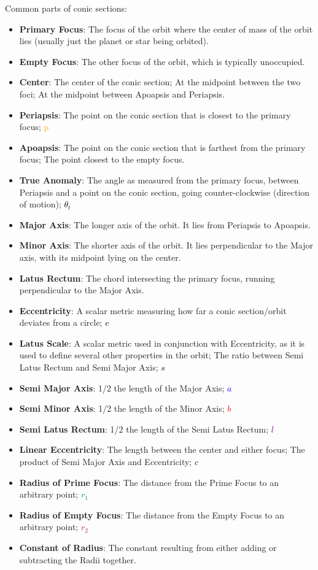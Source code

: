 Common parts of conic sections:
\begin{itemize}
    \item \textbf{Primary Focus}: The focus of the orbit where the center of mass of the orbit lies (usually just the planet or star being orbited).
    \item \textbf{Empty Focus}\aster: The other focus of the orbit, which is typically unoccupied.
    \item \textbf{Center}\aster: The center of the conic section; At the midpoint between the two foci; At the midpoint between Apoapsis and Periapsis.
    \item \textbf{Periapsis}: The point on the conic section that is closest to the primary focus; \textcolor{orange}{p}
    \item \textbf{Apoapsis}\aster: The point on the conic section that is farthest from the primary focus; The point closest to the empty focus.
    \item \textbf{True Anomaly}: The angle as measured from the primary focus, between Periapsis and a point on the conic section, going counter-clockwise (direction of motion); \textcolor{black}{$\theta_t$}
    \item \textbf{Major Axis}\aster: The longer axis of the orbit. It lies from Periapsis to Apoapsis.
    \item \textbf{Minor Axis}\aster: The shorter axis of the orbit. It lies perpendicular to the Major axis, with its midpoint lying on the center.
    \item \textbf{Latus Rectum}: The chord intersecting the primary focus, running perpendicular to the Major Axis.
    \item \textbf{Eccentricity}: A scalar metric measuring how far a conic section/orbit deviates from a circle; \textcolor{black}{$e$}
    \item \textbf{Latus Scale}: A scalar metric used in conjunction with Eccentricity, as it is used to define several other properties in the orbit; The ratio between Semi Latus Rectum and Semi Major Axis; \textcolor{black}{$s$}
    \item \textbf{Semi Major Axis}\aster: 1/2 the length of the Major Axis;  \textcolor{blue}{$a$}
    \item \textbf{Semi Minor Axis}\aster: 1/2 the length of the Minor Axis; \textcolor{red}{$b$}
    \item \textbf{Semi Latus Rectum}: 1/2 the length of the Semi Latus Rectum;  \textcolor{purple}{$l$}
    \item \textbf{Linear Eccentricity}\aster: The length between the center and either focus; The product of Semi Major Axis and Eccentricity; \textcolor{OliveGreen}{$c$}
    \item \textbf{Radius of Prime Focus}: The distance from the Prime Focus to an arbitrary point; \textcolor{teal}{$r_1$}
    \item \textbf{Radius of Empty Focus}\aster: The distance from the Empty Focus to an arbitrary point; \textcolor{brown}{$r_2$}
    \item \textbf{Constant of Radius}: The constant resulting from either adding or subtracting the Radii together.
\end{itemize}
\bigskip

